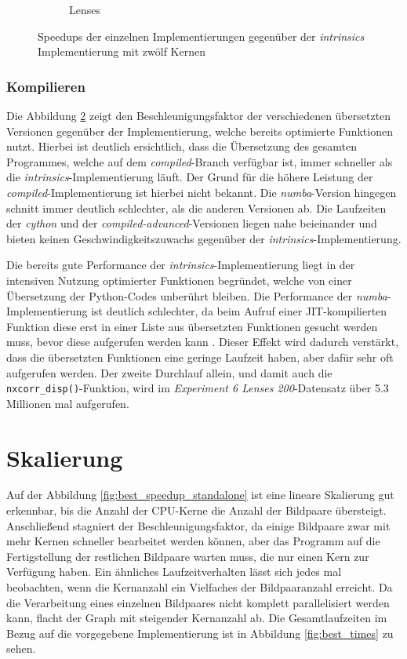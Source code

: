 \begin{center}
\begin{figure}[htbp]
\begin{subfigure}[b]{0.54\textwidth}
			\caption{Lenses}
			\label{fig:speedups_lenses}
		\end{subfigure}
		\caption{Speedups der einzelnen Implementierungen gegenüber der \textit{intrinsics} Implementierung mit zwölf Kernen}
		\label{fig:speedups}
	\end{figure}
\end{center}

\subsubsection{Kompilieren}

Die Abbildung \ref{fig:speedups} zeigt den Beschleunigungsfaktor der verschiedenen übersetzten Versionen gegenüber der Implementierung, welche bereits optimierte Funktionen nutzt. Hierbei ist deutlich ersichtlich, dass die Übersetzung des gesamten Programmes, welche auf dem \textit{compiled}-Branch verfügbar ist, immer schneller als die \textit{intrinsics}-Implementierung läuft. Der Grund für die höhere Leistung der \textit{compiled}-Implementierung ist hierbei nicht bekannt. Die \textit{numba}-Version hingegen schnitt immer deutlich schlechter, als die anderen Versionen ab. Die Laufzeiten der \textit{cython} und der \textit{compiled-advanced}-Versionen liegen nahe beieinander und bieten keinen Geschwindigkeitszuwachs gegenüber der \textit{intrinsics}-Implementierung. 

Die bereits gute Performance der \textit{intrinsics}-Implementierung liegt in der intensiven Nutzung optimierter Funktionen begründet, welche von einer Übersetzung der Python-Codes unberührt bleiben. Die Performance der \textit{numba}-Implementierung ist deutlich schlechter, da beim Aufruf einer \gls{JIT}-kompilierten Funktion diese erst in einer Liste aus übersetzten Funktionen gesucht werden muss, bevor diese aufgerufen werden kann \cite{PKA17}. Dieser Effekt wird dadurch verstärkt, dass die übersetzten Funktionen eine geringe Laufzeit haben, aber dafür sehr oft aufgerufen werden. Der zweite Durchlauf allein, und damit auch die \texttt{nxcorr\_disp()}-Funktion, wird im \textit{Experiment 6 Lenses 200}-Datensatz über 5.3 Millionen mal aufgerufen. 

\section{Skalierung}

Auf der Abbildung \ref{fig:best_speedup_standalone} ist eine lineare Skalierung gut erkennbar, bis die Anzahl der \gls{CPU}-Kerne die Anzahl der Bildpaare übersteigt. Anschließend stagniert der Beschleunigungsfaktor, da einige Bildpaare zwar mit mehr Kernen schneller bearbeitet werden können, aber das Programm auf die Fertigstellung der restlichen Bildpaare warten muss, die nur einen Kern zur Verfügung haben. Ein ähnliches Laufzeitverhalten lässt sich jedes mal beobachten, wenn die Kernanzahl ein Vielfaches der Bildpaaranzahl erreicht. Da die Verarbeitung eines einzelnen Bildpaares nicht komplett parallelisiert werden kann, flacht der Graph mit steigender Kernanzahl ab. Die Gesamtlaufzeiten im Bezug auf die vorgegebene Implementierung ist in Abbildung \ref{fig:best_times} zu sehen. 

